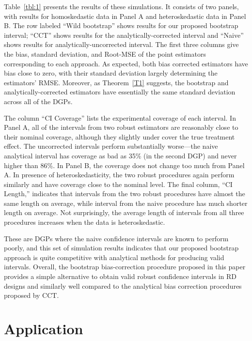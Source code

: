 \documentclass[12pt,fleqn]{article}
\begin{document}
Table~\ref{tbl:1} presents the results of these simulations. It consists of two panels, with results for homoskedastic data in Panel A and heteroskedastic data in Panel B. The row labeled
``Wild bootstrap'' shows results for our proposed bootstrap interval; ``CCT'' shows
results for the analytically-corrected interval and ``Naive'' shows results for analytically-uncorrected interval. The first three columns give the bias,
standard deviation, and Root-MSE of the point
estimators corresponding to each approach.  As expected, both
bias corrected estimators have
bias close to zero, with their standard deviation largely
determining the estimators' RMSE. Moreover, as Theorem~\ref{T1} suggests, the
bootstrap and analytically-corrected estimators have essentially the same
standard deviation across all of the DGPs.

The column ``CI Coverage'' lists the experimental coverage of each interval.  In
Panel A, all of the intervals from two robust estimators are reasonably close to
their nominal coverage, although they slightly under cover the true treatment
effect. The uncorrected intervals perform substantially worse---the naive
analytical interval has coverage as bad as 35\% (in the second DGP) and never
higher than 86\%. In Panel B, the coverage does not change too much from Panel
A. In presence of heteroskedasticity, the two robust procedures again perform
similarly and have coverage close to the nominal level. The final column, ``CI
Length,'' indicates that intervals from the two robust procedures have almost
the same length on average, while interval from the naive procedure has much
shorter length on average. Not surprisingly, the average length of intervals
from all three procedures increases when the data is heteroskedastic.

These are DGPs where the naive confidence intervals are known to perform poorly,
and this set of simulation results indicates that our proposed bootstrap approach
is quite competitive with analytical methods for producing valid intervals.
Overall, the bootstrap bias-correction procedure proposed in this paper provides
a simple alternative to obtain valid robust confidence intervals in RD designs
and similarly well compared to the analytical bias correction procedures proposed
by CCT.

\section{Application}\label{application}
\end{document}
